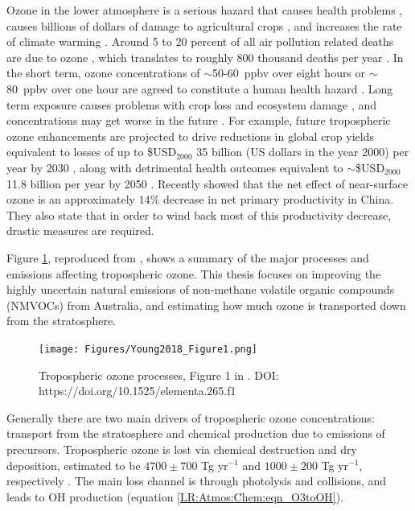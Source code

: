    Ozone in the lower atmosphere is a serious hazard that causes health problems \parencite{Hsieh2013}, causes billions of dollars of damage to agricultural crops \parencite{Avnery2011,Yue2017}, and increases the rate of climate warming \parencite{IPCC_2013_chap8}.
    Around 5 to 20 percent of all air pollution related deaths are due to ozone \parencite{Monks2015}, which translates to roughly 800 thousand deaths per year \parencite{Lelieveld2013}.
    In the short term, ozone concentrations of $\sim$50-60~ppbv over eight hours or $\sim$80~ppbv over one hour are agreed to constitute a human health hazard \parencite{Ayers2006,Lelieveld2009}. 
    Long term exposure causes problems with crop loss and ecosystem damage \parencite{Emberson2003}, and concentrations may get worse in the future \parencite{Lelieveld2009, Stevenson2013}.
    For example, future tropospheric ozone enhancements are projected to drive 
    reductions in global crop yields equivalent to losses of up to 
    \$USD$_{2000}$ 35 billion (US dollars in the year 2000) per year by 2030 
    \parencite{Avnery2011}, along with detrimental health outcomes equivalent 
    to $\sim$\$USD$_{2000}$11.8 billion per year by 2050 \parencite{Selin2009}.
    Recently \textcite{Yue2017} showed that the net effect of near-surface ozone is an approximately $14\%$ decrease in net primary productivity in China.
    They also state that in order to wind back most of this productivity decrease, drastic measures are required. %
    
    Figure \ref{LR:O3:fig_YoungOzoneSummary}, reproduced from \textcite{Young2018}, shows a summary of the major processes and emissions affecting tropospheric ozone.
    This thesis focuses on improving the highly uncertain natural emissions of 
    non-methane volatile organic compounds (NMVOCs) from Australia, and 
    estimating how much ozone is transported down from the stratosphere.
    
    \begin{figure}
      \texttt{[image: Figures/Young2018\_Figure1.png]}
      \caption{%
        Tropospheric ozone processes, Figure 1 in \textcite{Young2018}.
        DOI: https://doi.org/10.1525/elementa.265.f1
      }
      \label{LR:O3:fig_YoungOzoneSummary}
    \end{figure}
  
    Generally there are two main drivers of tropospheric ozone concentrations: 
    transport from the stratosphere and chemical production due to emissions of 
    precursors. 
    Tropospheric ozone is lost via chemical destruction and dry deposition, 
    estimated to be $4700\pm700$ Tg yr$^{-1}$ and $1000\pm200$ Tg yr$^{-1}$, 
    respectively \parencite{Stevenson2006,Young2018}.
    The main loss channel is through photolysis and collisions, and leads to OH 
    production (equation \ref{LR:Atmos:Chem:eqn_O3toOH}).
  
